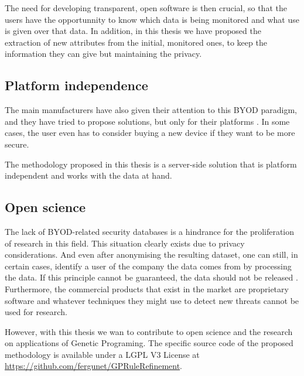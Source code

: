 The need for developing transparent, open software is then crucial, so that the users have the opportunnity to know which data is being monitored and what use is given over that data. In addition, in this thesis we have proposed the extraction of new attributes from the initial, monitored ones, to keep the information they can give but maintaining the privacy.

\subsection{Platform independence}
\label{subsec:platf_ind}

The main manufacturers have also given their attention to this BYOD paradigm, and they have tried to propose solutions, but only for their platforms \cite{de2015corporate}. In some cases, the user even has to consider buying a new device if they want to be more secure.

The methodology proposed in this thesis is a server-side solution that is platform independent and works with the data at hand.

\subsection{Open science}
\label{subsec:openS}

The lack of BYOD-related security databases is a hindrance for the proliferation of research in this field. This situation clearly exists due to privacy considerations. And even after anonymising the resulting dataset, one can still, in certain cases, identify a user of the company the data comes from by processing the data. If this principle cannot be guaranteed, the data should not be released \cite{boillat2014handbook}. Furthermore, the commercial products that exist in the market \cite{de2015corporate} are proprietary software and whatever techniques they might use to detect new threats cannot be used for research.

However, with this thesis we wan to contribute to open science and the research on applications of Genetic Programing. The specific source code of the proposed methodology is available under a LGPL V3 License at \url{https://github.com/fergunet/GPRuleRefinement}.

